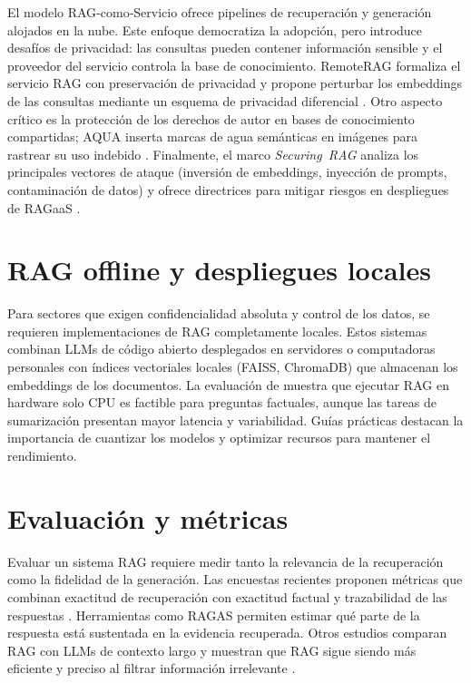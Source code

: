 El modelo RAG‑como‑Servicio ofrece pipelines de recuperación y generación alojados en la nube. Este enfoque democratiza la adopción, pero introduce desafíos de privacidad: las consultas pueden contener información sensible y el proveedor del servicio controla la base de conocimiento. RemoteRAG formaliza el servicio RAG con preservación de privacidad y propone perturbar los embeddings de las consultas mediante un esquema de privacidad diferencial \cite{Cheng2025RemoteRAG}. Otro aspecto crítico es la protección de los derechos de autor en bases de conocimiento compartidas; AQUA inserta marcas de agua semánticas en imágenes para rastrear su uso indebido \cite{Chen2025AQUA}. Finalmente, el marco \emph{Securing RAG} analiza los principales vectores de ataque (inversión de embeddings, inyección de prompts, contaminación de datos) y ofrece directrices para mitigar riesgos en despliegues de RAGaaS \cite{Ammann2025SecuringRAG}.

\section{RAG offline y despliegues locales}

Para sectores que exigen confidencialidad absoluta y control de los datos, se requieren implementaciones de RAG completamente locales. Estos sistemas combinan LLMs de código abierto desplegados en servidores o computadoras personales con índices vectoriales locales (FAISS, ChromaDB) que almacenan los embeddings de los documentos. La evaluación de \cite{Tyndall2025OfflineRAG} muestra que ejecutar RAG en hardware solo CPU es factible para preguntas factuales, aunque las tareas de sumarización presentan mayor latencia y variabilidad. Guías prácticas destacan la importancia de cuantizar los modelos y optimizar recursos para mantener el rendimiento.

\section{Evaluación y métricas}

Evaluar un sistema RAG requiere medir tanto la relevancia de la recuperación como la fidelidad de la generación. Las encuestas recientes proponen métricas que combinan exactitud de recuperación con exactitud factual y trazabilidad de las respuestas \cite{Gan2025RAGEvaluationSurvey,Yu2024RAGEvalSurvey}. Herramientas como RAGAS permiten estimar qué parte de la respuesta está sustentada en la evidencia recuperada. Otros estudios comparan RAG con LLMs de contexto largo y muestran que RAG sigue siendo más eficiente y preciso al filtrar información irrelevante \cite{Li2024LCvsRAG}.

